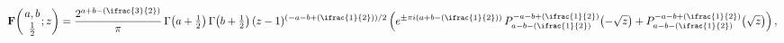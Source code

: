 \[\mathop{\mathbf{F}\/}\nolimits\!\left({a,b\atop\tfrac{1}{2}};z\right)=\frac{2^%
{a+b-(\ifrac{3}{2})}}{\pi}\mathop{\Gamma\/}\nolimits\!\left(a+\tfrac{1}{2}%
\right)\mathop{\Gamma\/}\nolimits\!\left(b+\tfrac{1}{2}\right)\*(z-1)^{(-a-b+(%
\ifrac{1}{2}))/2}\*\left(e^{\pm\pi i(a+b-(\ifrac{1}{2}))}\mathop{P^{-a-b+(%
\ifrac{1}{2})}_{a-b-(\ifrac{1}{2})}\/}\nolimits\!\left(-\sqrt{z}\right)+%
\mathop{P^{-a-b+(\ifrac{1}{2})}_{a-b-(\ifrac{1}{2})}\/}\nolimits\!\left(\sqrt{%
z}\right)\right),\]